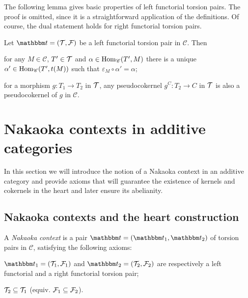 The following lemma gives basic properties of left functorial torsion pairs. The proof is omitted, since it is a straightforward application of the definitions. Of course, the dual statement holds for right functorial torsion pairs.

\begin{lemma}\label{rmk:1.1}
  Let $\t=(\T,\F)$ be a left functorial torsion pair in $\mathscr{C}$. Then
\begin{enumerate}[label=(\alph*)]
\item\label{rmk:1.1a} for any $M\in\mathscr{C}$, $T'\in\mathcal{T}$ and $\alpha\in\operatorname{Hom}_\mathscr{C}(T',M)$ there is a unique $\alpha'\in\operatorname{Hom}_\mathscr{C}(T',t(M))$ such that $\varepsilon_M\circ\alpha'=\alpha$;

  \begin{sloppypar}
\item\label{rmk:1.1b} for a morphism $g:T_1\to T_2$ in $\mathcal{T}$, any pseudocokernel ${g^C:T_2\to C}$ in $\mathcal{T}$ is also a pseudocokernel of $g$ in $\mathscr{C}$.
\end{sloppypar}
\end{enumerate}
\end{lemma}

\section{Nakaoka contexts in additive categories}\label{sec:nakaoka_contexts}

In this section we will introduce the notion of a Nakaoka context in an additive category and provide axioms that will guarantee the existence of kernels and cokernels in the heart and later ensure its abelianity.

\subsection{Nakaoka contexts and the heart construction}

\begin{definition}
  A \emph{Nakaoka context} is a pair $\t=(\t_1,\t_2)$ of torsion pairs in $\mathscr{C}$, satisfying the following axioms:
  \begin{torsionaxioms}
    \item\label{ax:ct1} $\t_1=(\T_1,\F_1)$ and $\t_2=(\T_2,\F_2)$ are respectively a left functorial and a right functorial torsion pair;
    \item\label{ax:ct2} $\mathcal{T}_2\subseteq \mathcal{T}_1$ (equiv. $\mathcal{F}_1\subseteq\mathcal{F}_2$).
  \end{torsionaxioms}
\end {definition}

